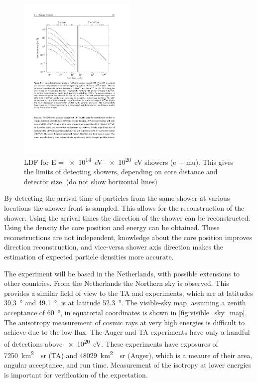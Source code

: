 \begin{figure}
    \centering
    \includegraphics[width=0.5\textwidth]
                    {plots/experiment/ldf_energies}
    \caption{LDF for E = \SIrange{e14}{e20}{\eV} showers (e + mu). This gives the limits of detecting showers, depending on core distance and detector size. (do not show horizontal lines)}
    \label{fig:ldf_energies}
\end{figure}

By detecting the arrival time of particles from the same shower at various locations the shower front is sampled. This allows for the reconstruction of the shower. Using the arrival times the direction of the shower can be reconstructed. Using the density the core position and energy can be obtained. These reconstructions are not independent, knowledge about the core position improves direction reconstruction, and vice-versa shower axis direction makes the estimation of expected particle densities more accurate.

The experiment will be based in the Netherlands, with possible extensions to other countries. From the Netherlands the Northern sky is observed. This provides a similar field of view to the TA and \kascade experiments, which are at latitudes \SI{39.3}{\degree} and \SI{49.1}{\degree}. \nikhef is at latitude \SI{52.3}{\degree}. The visible-sky map, assuming a zenith acceptance of \SI{60}{\degree}, in equatorial coordinates is shown in \cref{fig:visible_sky_map}. The anisotropy measurement of cosmic rays at very high energies is difficult to achieve due to the low flux. The Auger and TA experiments have only a handful of detections above \SI{e20}{\eV}. These experiments have exposures of \SI{7250}{\kilo\meter\squared\year\steradian} (TA) and \SI{48029}{\kilo\meter\squared\year\steradian} (Auger), which is a meaure of their area, angular acceptance, and run time. Measurement of the isotropy at lower energies is important for verification of the expectation.


